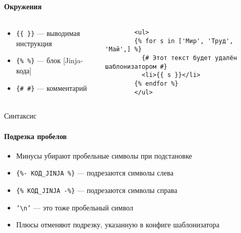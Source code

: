 \begin{frame}[fragile]
  \frametitle{\Insertsubsection}
  \framesubtitle{Окружения}

  \begin{columns}
    \begin{column}{0.40\textwidth}
      \begin{itemize}[<+-| @alert ->]
        \item \texttt{\{\{ \}\}} --- выводимая инструкция \baselinespace{}
        \item \texttt{\{\% \%\}} --- блок [Jinja-кода] \baselinespace{}
        \item \texttt{\{{\# \#}\}} --- комментарий
      \end{itemize}
    \end{column}
    \begin{column}{0.55\textwidth}
      \begin{verbatim}
        <ul>
        {% for s in ['Мир', 'Труд', 'Май',] %}
          {# Этот текст будет удалён шаблонизатором #}
          <li>{{ s }}</li>
        {% endfor %}
        </ul>
      \end{verbatim}
    \end{column}
  \end{columns}

  \vfill

  \onslide<+->
\end{frame}

\begin{frame}{Синтаксис}
  \framesubtitle{Подрезка пробелов}
   \begin{itemize}[<+-| alert@ +>]
     \item[\faCut] Минусы убирают пробельные символы при подстановке
     \item[{\faArrowAltCircleLeft[regular]}] \texttt{\{\%- КОД\_JINJA \%\}} ---
       подрезаются символы слева
     \item[{\faArrowAltCircleRight[regular]}] \texttt{\{\% КОД\_JINJA -\%\}}
       --- подрезаются символы справа
     \item[\faParagraph] \texttt{'\textbackslash{}n'} --- это тоже пробельный
       символ
     \item[\faBan] Плюсы отменяют подрезку, указанную в конфиге шаблонизатора
   \end{itemize}
\end{frame}

